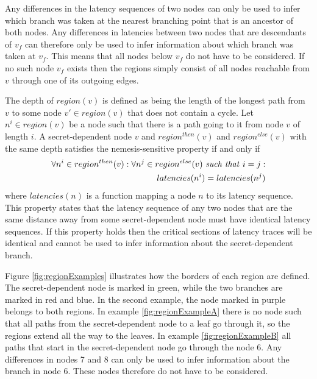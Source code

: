 Any differences in the latency sequences of two nodes can only be used to infer which branch was taken at the nearest branching point that is an ancestor of both nodes. 
Any differences in latencies between two nodes that are descendants of $v_f$ can therefore only be used to infer information about which branch was taken at $v_f$. 
This means that all nodes below $v_f$ do not have to be considered. If no such node $v_f$ exists then the regions simply consist of all nodes reachable from $v$ through one of its outgoing edges. 

The depth of $region(v)$ is defined as being the length of the longest path from $v$ to some node $v' \in region(v)$ that does not contain a cycle.
Let $n^i \in region(v)$ be a node such that there is a path going to it from node $v$ of length $i$. 
A secret-dependent node $v$ and $region^{then}(v)$ and $region^{else}(v)$ with the same depth satisfies the nemesis-sensitive property if and only if 
\begin{equation} \label{eq:nemesisPropertyNode}
    \begin{split}
    \forall n^i \in region^{then}(v) : \forall n^j \in region^{else}(v) \text{ \textit{such that} } i=j :  \\ 
    latencies(n^i) = latencies(n^j)
    \end{split}
\end{equation}
where $latencies(n)$ is a function mapping a node $n$ to its latency sequence. This property states that the latency sequence of any two nodes that are the same distance away 
from some secret-dependent node must have identical latency sequences. If this property holds then the critical sections of latency traces will be identical and cannot be used to 
infer information about the secret-dependent branch. 

Figure \ref{fig:regionExamples} illustrates how the borders of each region are defined. The secret-dependent node is marked in green, while the two branches are marked in red and blue. In the second example, the node marked in purple belongs to both regions. In example \ref{fig:regionExampleA} there is no node such that all paths from the secret-dependent node to a leaf go through it, so the regions extend all the way to the leaves. In example \ref{fig:regionExampleB} all paths that start in the secret-dependent node go through the node 6. Any differences in nodes 7 and 8 can only be used to infer information about the branch in node 6. These nodes therefore do not have to be considered.  

